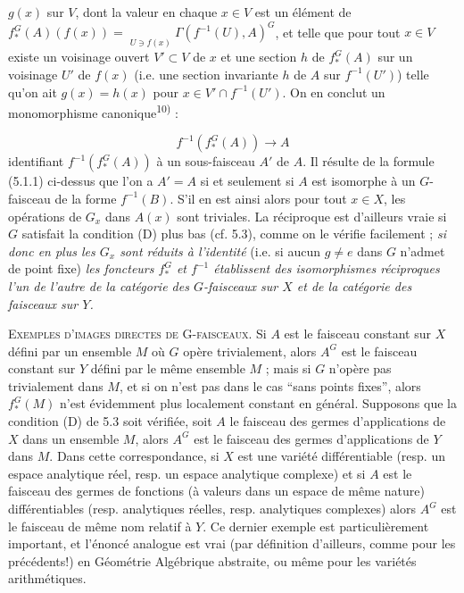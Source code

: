 \clearpage
{}

$g(x)$ sur $V$, dont la valeur en chaque $x\in V$ est un élément de $f_*^G(A)(f(x))=\mathop{\underset{\to}{\mathrm{lim.}}}\limits_{U\ni f(x)}\Gamma(f^{-1}(U),A)^G$,
et telle que pour tout $x\in V$ existe un voisinage ouvert $V'\subset V$ de
$x$ et une section $h$ de $f_*^G(A)$ sur un voisinage $U'$ de $f(x)$ (i.e.
une section invariante $h$ de $A$ sur $f^{-1}(U')$) telle qu'on ait
$g(x)=h(x)$ pour $x\in V'\cap f^{-1}(U')$. On en conclut un monomorphisme
canonique\textsuperscript{10)} :

\[
f^{-1}(f_*^G(A))\to A
\tag{5.1.2}
\]
identifiant $f^{-1}(f_*^G(A))$ à un sous-faisceau $A'$ de $A$. Il résulte de
la formule (5.1.1) ci-dessus que l'on a $A'=A$ si et seulement si $A$ est
isomorphe à un $G$-faisceau de la forme $f^{-1}(B)$. S'il en est ainsi alors
pour tout $x\in X$, les opérations de $G_x$ dans $A(x)$ sont triviales. La
réciproque est d'ailleurs vraie si $G$ satisfait la condition (D) plus bas
(cf. 5.3), comme on le vérifie facilement ;
\textit{si donc en plus les $G_x$ sont réduits à l'identité} (i.e. si aucun
$g\ne e$ dans $G$ n'admet de point fixe) \textit{les foncteurs $f_*^G$ et
$f^{-1}$ établissent des isomorphismes réciproques l'un de l'autre de la
catégorie des $G$-faisceaux sur $X$ et de la catégorie des faisceaux sur $Y$.}

\textsc{Exemples d'images directes de G-faisceaux.} Si $A$ est le
faisceau constant sur $X$ défini par un ensemble $M$ où $G$ opère
trivialement, alors $A^G$ est le faisceau constant sur $Y$ défini par le même
ensemble $M$ ; mais si $G$ n'opère pas trivialement dans $M$, et si on n'est
pas dans le cas ``sans points fixes'', alors $f_*^G(M)$ n'est évidemment plus
localement constant en général.
Supposons que la condition (D) de 5.3 soit vérifiée, soit $A$ le faisceau des
germes d'applications de $X$ dans un ensemble $M$, alors $A^G$ est le faisceau
des germes d'applications de $Y$ dans $M$. Dans cette correspondance, si $X$
est une variété différentiable (resp. un espace analytique réel, resp. un
espace analytique complexe) et si $A$ est le faisceau des germes de fonctions
(à valeurs dans un espace de même nature) différentiables (resp. analytiques
réelles, resp. analytiques complexes) alors $A^G$ est le faisceau de même nom
relatif à $Y$. Ce dernier exemple est particulièrement important, et l'énoncé
analogue est vrai (par définition d'ailleurs, comme pour les précédents!) en
Géométrie Algébrique abstraite, ou même pour les variétés arithmétiques.


